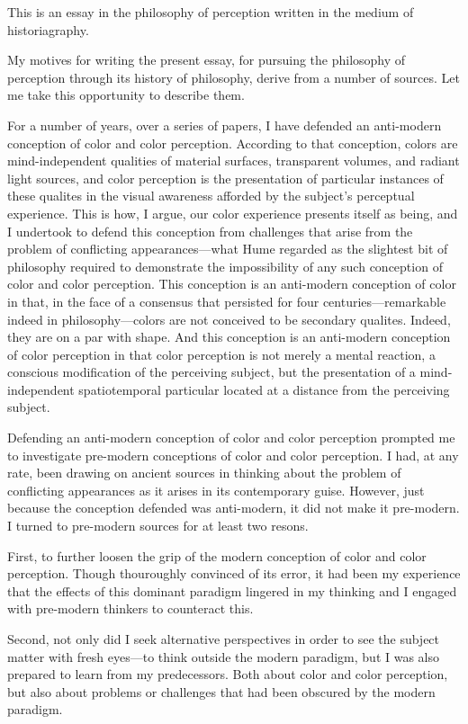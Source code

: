 This is an essay in the philosophy of perception written in the medium of historiagraphy. 

My motives for writing the present essay, for pursuing the philosophy of perception through its history of philosophy, derive from a number of sources. Let me take this opportunity to describe them.

For a number of years, over a series of papers, I have defended an anti-modern conception of color and color perception. According to that conception, colors are mind-independent qualities of material surfaces, transparent volumes, and radiant light sources, and color perception is the presentation of particular instances of these qualites in the visual awareness afforded by the subject's perceptual experience. This is how, I argue, our color experience presents itself as being, and I undertook to defend this conception from challenges that arise from the problem of conflicting appearances---what Hume regarded as the slightest bit of philosophy required to demonstrate the impossibility of any such conception of color and color perception. This conception is an anti-modern conception of color in that, in the face of a consensus that persisted for four centuries---remarkable indeed in philosophy---colors are not conceived to be secondary qualites. Indeed, they are on a par with shape. And this conception is an anti-modern conception of color perception in that color perception is not merely a mental reaction, a conscious modification of the perceiving subject, but the presentation of a mind-independent spatiotemporal particular located at a distance from the perceiving subject. 

Defending an anti-modern conception of color and color perception prompted me to investigate pre-modern conceptions of color and color perception. I had, at any rate, been drawing on ancient sources in thinking about the problem of conflicting appearances as it arises in its contemporary guise. However, just because the conception defended was anti-modern, it did not make it pre-modern. I turned to pre-modern sources for at least two resons. 

First, to further loosen the grip of the modern conception of color and color perception. Though thouroughly convinced of its error, it had been my experience that the effects of this dominant paradigm lingered in my thinking and I engaged with pre-modern thinkers to counteract this. 

Second, not only did I seek alternative perspectives in order to see the subject matter with fresh eyes---to think outside the modern paradigm, but I was also prepared to learn from my predecessors. Both about color and color perception, but also about problems or challenges that had been obscured by the modern paradigm. 

